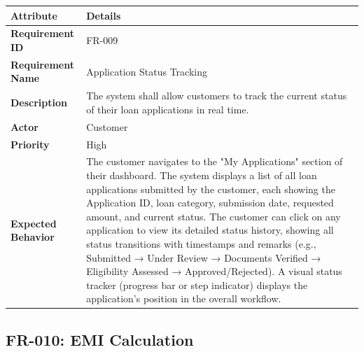 \documentclass[12pt,a4paper,oneside]{report}
\begin{document}
\begin{table}[htbp]
\centering
\small
\begin{tabularx}{\textwidth}{l l}
\toprule
\textbf{Attribute} & \textbf{Details} \\
\midrule
\textbf{Requirement ID} & FR-009 \\
\textbf{Requirement Name} & Application Status Tracking \\
\textbf{Description} & The system shall allow customers to track the current status of their loan applications in real time. \\
\textbf{Actor} & Customer \\
\textbf{Priority} & High \\
\textbf{Expected Behavior} & The customer navigates to the "My Applications" section of their dashboard. The system displays a list of all loan applications submitted by the customer, each showing the Application ID, loan category, submission date, requested amount, and current status. The customer can click on any application to view its detailed status history, showing all status transitions with timestamps and remarks (e.g., Submitted → Under Review → Documents Verified → Eligibility Assessed → Approved/Rejected). A visual status tracker (progress bar or step indicator) displays the application's position in the overall workflow. \\
\bottomrule
\end{tabularx}
\end{table}

\subsection{FR-010: EMI Calculation}
\end{document}
